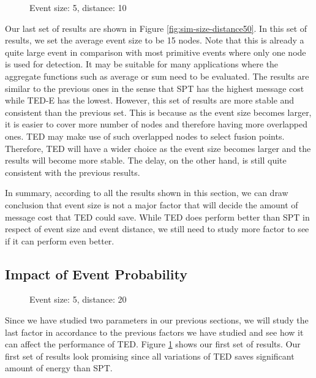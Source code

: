 \begin{figure}
\centering
{}
\caption{Event size: 5, distance: 10}
\label{fig:sim-prob-size5-dist10}
\end{figure}

Our last set of results are shown in Figure \ref{fig:sim-size-distance50}. In this set of results, we set the average event size to be 15 nodes. Note that this is already a quite large event in comparison with most primitive events where only one node is used for detection. It may be suitable for many applications where the aggregate functions such as average or sum need to be evaluated. The results are similar to the previous ones in the sense that SPT has the highest message cost while TED-E has the lowest. However, this set of results are more stable and consistent than the previous set. This is because as the event size becomes larger, it is easier to cover more number of nodes and therefore having more overlapped ones. TED may make use of such overlapped nodes to select fusion points. Therefore, TED will have a wider choice as the event size becomes larger and the results will become more stable. The delay, on the other hand, is still quite consistent with the previous results.

In summary, according to all the results shown in this section, we can draw conclusion that event size is not a major factor that will decide the amount of message cost that TED could save. While TED does perform better than SPT in respect of event size and event distance, we still need to study more factor to see if it can perform even better.

\subsection{Impact of Event Probability}

\begin{figure}
\centering
{}
\caption{Event size: 5, distance: 20}
\label{fig:sim-prob-size5-dist20}
\end{figure}

Since we have studied two parameters in our previous sections, we will study the last factor in accordance to the previous factors we have studied and see how it can affect the performance of TED. Figure \ref{fig:sim-prob-size5-dist10} shows our first set of results. Our first set of results look promising since all variations of TED saves significant amount of energy than SPT.

